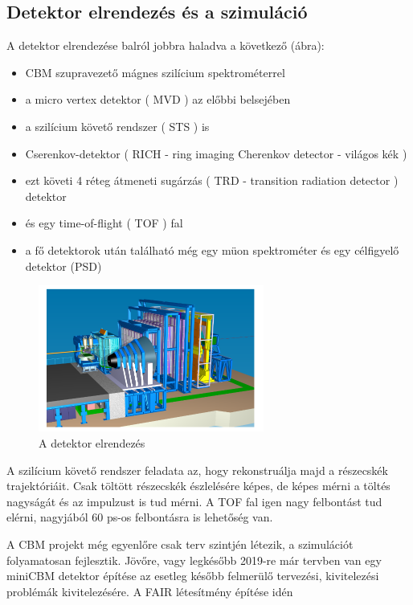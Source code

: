 \documentclass[a4paper,12pt]{article}
\begin{document}
\subsection{ Detektor elrendezés és a szimuláció}
\par A detektor elrendezése balról jobbra haladva a következő (ábra):
\begin{itemize}
	\item CBM szupravezető mágnes szilícium spektrométerrel
	\item a micro vertex detektor ( MVD ) az előbbi belsejében
	\item a szilícium követő rendszer ( STS ) is
	\item Cserenkov-detektor ( RICH - ring imaging Cherenkov detector - világos kék )
	\item ezt követi 4 réteg átmeneti sugárzás ( TRD - transition radiation detector ) detektor
	\item és egy time-of-flight ( TOF ) fal
	\item a fő detektorok után található még egy müon spektrométer és egy célfigyelő detektor (PSD)  
\end{itemize}
\begin{figure}[H]
	\centering
	\includegraphics[width=0.66\textwidth]{cbm_detector.png}
	\caption{ A detektor elrendezés }
\end{figure}
\par A szilícium követő rendszer feladata az, hogy rekonstruálja majd a részecskék trajektóriáit. Csak töltött részecskék észlelésére képes, 
de képes mérni a töltés nagyságát és az impulzust is tud mérni. A TOF fal igen nagy felbontást tud elérni, nagyjából 60 ps-os felbontásra is
lehetőség van.
\vspace{5mm}
\par A CBM projekt még egyenlőre csak terv szintjén létezik, a szimulációt folyamatosan fejlesztik. Jövőre, vagy legkésőbb 2019-re már tervben 
van egy miniCBM detektor építése az esetleg később felmerülő tervezési, kivitelezési problémák kivitelezésére. A FAIR létesítmény építése idén 
\end{document}
